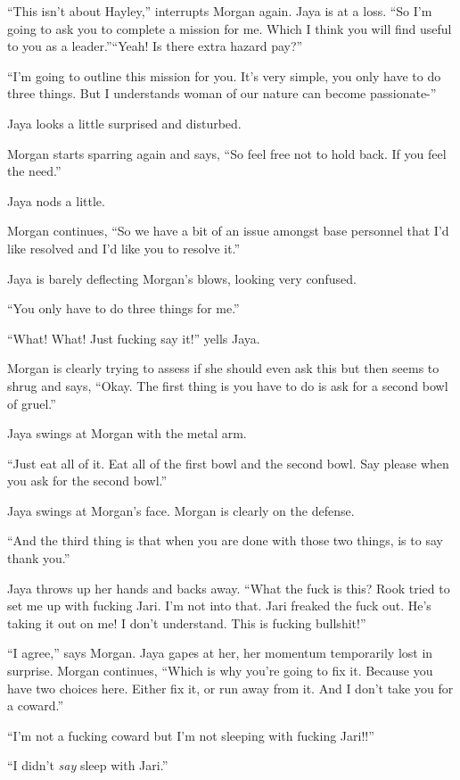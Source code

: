 ``This isn't about Hayley,'' interrupts Morgan again.  Jaya is at a loss.  ``So I'm going to ask you to complete a mission for me. Which I think you will find useful to you as a leader.''``Yeah!  Is there extra hazard pay?''

``I'm going to outline this mission for you.  It's very simple, you only have to do three things.  But I understands woman of our nature can become passionate-''  

Jaya looks a little surprised and disturbed.

Morgan starts sparring again and says, ``So feel free not to hold back.  If you feel the need.''  

Jaya nods a little.

Morgan continues, ``So we have a bit of an issue amongst base personnel that I'd like resolved and I'd like you to resolve it.''

Jaya is barely deflecting Morgan's blows, looking very confused.

``You only have to do three things for me.''

``What!  What!  Just fucking say it!'' yells Jaya.

Morgan is clearly trying to assess if she should even ask this but then seems to shrug and says, ``Okay. The first thing is you have to do is ask for a second bowl of gruel.''

Jaya swings at Morgan with the metal arm. 

``Just eat all of it. Eat all of the first bowl and the second bowl.  Say please when you ask for the second bowl.''

Jaya swings at Morgan's face.  Morgan is clearly on the defense.

``And the third thing is that when you are done with those two things, is to say thank you.''

Jaya throws up her hands and backs away. ``What the fuck is this?  Rook tried to set me up with fucking Jari.  I'm not into that.  Jari freaked the fuck out.  He's taking it out on me!  I don't understand.  This is fucking bullshit!''

``I agree,'' says Morgan.  Jaya gapes at her, her momentum temporarily lost in surprise.  Morgan continues, ``Which is why you're going to fix it.  Because you have two choices here.  Either fix it, or run away from it.  And I don't take you for a coward.''

``I'm not a fucking coward but I'm not sleeping with fucking Jari!!''

``I didn't \textit{say} sleep with Jari.''

